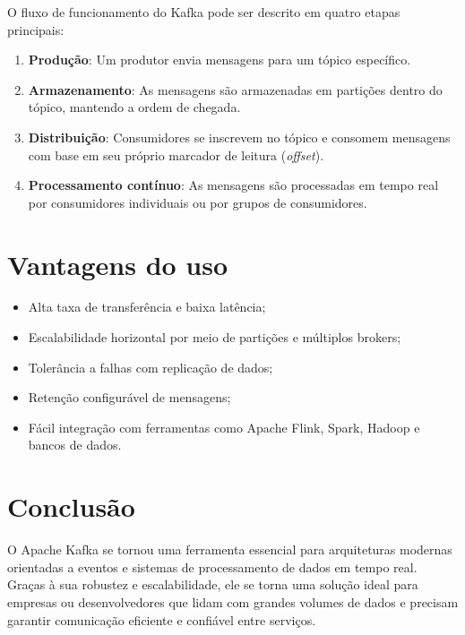 \documentclass{abntex2}
\begin{document}
O fluxo de funcionamento do Kafka pode ser descrito em quatro etapas principais:

\begin{enumerate}
    \item \textbf{Produção}: Um produtor envia mensagens para um tópico específico.
    \item \textbf{Armazenamento}: As mensagens são armazenadas em partições dentro do tópico, mantendo a ordem de chegada.
    \item \textbf{Distribuição}: Consumidores se inscrevem no tópico e consomem mensagens com base em seu próprio marcador de leitura (\textit{offset}).
    \item \textbf{Processamento contínuo}: As mensagens são processadas em tempo real por consumidores individuais ou por grupos de consumidores.
\end{enumerate}

\section{Vantagens do uso}
\begin{itemize}
    \item Alta taxa de transferência e baixa latência;
    \item Escalabilidade horizontal por meio de partições e múltiplos brokers;
    \item Tolerância a falhas com replicação de dados;
    \item Retenção configurável de mensagens;
    \item Fácil integração com ferramentas como Apache Flink, Spark, Hadoop e bancos de dados.
\end{itemize}

\section{Conclusão}
O Apache Kafka se tornou uma ferramenta essencial para arquiteturas modernas orientadas a eventos e sistemas de processamento de dados em tempo real. 
Graças à sua robustez e escalabilidade, ele se torna uma solução ideal para empresas ou desenvolvedores que lidam com grandes volumes de dados e precisam garantir comunicação eficiente e confiável entre serviços.
\end{document}

